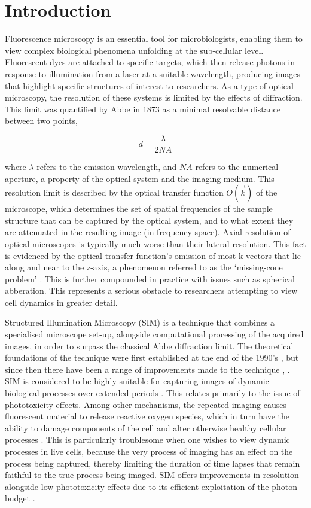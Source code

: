 \documentclass[12pt]{article}
\newcommand\NA{\mathit{NA}}
\begin{document}
\newpage
\tableofcontents

\newpage
{}
\section{Introduction}

Fluorescence microscopy is an essential tool for microbiologists,
enabling them to view complex biological phenomena unfolding at the sub-cellular level.
Fluorescent dyes are attached to specific targets,
which then release photons in response to illumination from a laser at a suitable wavelength,
producing images that highlight specific structures of interest to researchers.
As a type of optical microscopy, the resolution of these systems is limited by the effects of diffraction.
This limit was quantified by Abbe \cite{abbe} in 1873 as a minimal resolvable distance between two points,

\[d=\frac{\lambda}{2\NA}\]

where $\lambda$ refers to the emission wavelength, and $\NA$ refers to the numerical aperture,
a property of the optical system and the imaging medium.
This resolution limit is described by the optical transfer function $O(\vec{k})$ of the microscope,
which determines the set of spatial frequencies of the sample structure that can be captured by the optical system,
and to what extent they are attenuated in the resulting image (in frequency space).
Axial resolution of optical microscopes is typically much worse than their lateral resolution.
This fact is evidenced by the optical transfer function's omission of most k-vectors that lie along and near to the z-axis,
a phenomenon referred to as the `missing-cone problem' \cite{missingcone}.
This is further compounded in practice with issues such as spherical abberation.
This represents a serious obstacle to researchers attempting to view cell dynamics in greater detail.

Structured Illumination Microscopy (SIM) is a technique that combines a specialised microscope set-up,
alongside computational processing of the acquired images,
in order to surpass the classical Abbe diffraction limit.
The theoretical foundations of the technique were first established at the end of the 1990's \cite{SIM2000},
but since then there have been a range of improvements made to the technique \cite{simalgorithms}, \cite{simreview}.
SIM is considered to be highly suitable for capturing images of dynamic biological processes over extended periods \cite{simreview}.
This relates primarily to the issue of phototoxicity effects.
Among other mechanisms, the repeated imaging causes fluorescent material to release reactive oxygen species,
which in turn have the ability to damage components of the cell and alter otherwise healthy cellular processes \cite{phototoxicity}.
This is particularly troublesome when one wishes to view dynamic processes in live cells,
because the very process of imaging has an effect on the process being captured,
thereby limiting the duration of time lapses that remain faithful to the true process being imaged.
SIM offers improvements in resolution alongside low phototoxicity effects due to its efficient exploitation of the photon budget \cite{simreview}.
\end{document}
